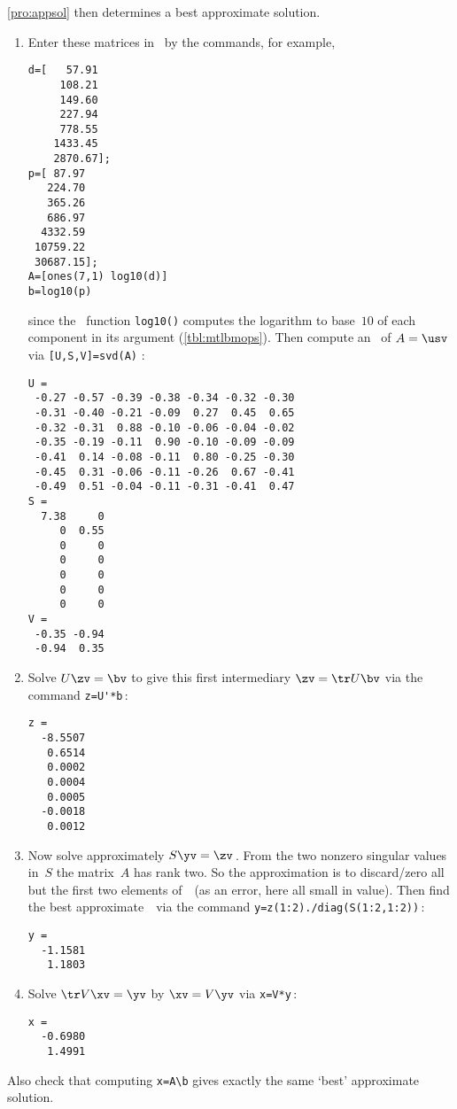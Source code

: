 \begin{example}
\begin{solution}
\cref{pro:appsol} then determines a best approximate solution.
\begin{enumerate}
\item Enter these matrices in \script\ by the commands, for example,
\setbox\ajrqrbox\hbox{}%
\marginajrbox%
\begin{verbatim}
d=[   57.91
     108.21
     149.60
     227.94
     778.55
    1433.45
    2870.67];
p=[ 87.97
   224.70
   365.26
   686.97
  4332.59
 10759.22
 30687.15];
A=[ones(7,1) log10(d)]
b=log10(p)
\end{verbatim}
since the \script\ function \verb|log10()| computes the logarithm to base~\(10\) of each component in its argument (\cref{tbl:mtlbmops}).
Then compute an \svd\ of \(A=\usv\) via \verb|[U,S,V]=svd(A)| \twodp:
\begin{verbatim}
U =
 -0.27 -0.57 -0.39 -0.38 -0.34 -0.32 -0.30
 -0.31 -0.40 -0.21 -0.09  0.27  0.45  0.65
 -0.32 -0.31  0.88 -0.10 -0.06 -0.04 -0.02
 -0.35 -0.19 -0.11  0.90 -0.10 -0.09 -0.09
 -0.41  0.14 -0.08 -0.11  0.80 -0.25 -0.30
 -0.45  0.31 -0.06 -0.11 -0.26  0.67 -0.41
 -0.49  0.51 -0.04 -0.11 -0.31 -0.41  0.47
S =
  7.38     0
     0  0.55
     0     0
     0     0
     0     0
     0     0
     0     0
V =
 -0.35 -0.94
 -0.94  0.35
\end{verbatim}
\item Solve \(U\zv=\bv\) to give this first intermediary \(\zv=\tr U\bv\) via the command \verb|z=U'*b|\,:
\begin{verbatim}
z =
  -8.5507
   0.6514
   0.0002
   0.0004
   0.0005
  -0.0018
   0.0012
\end{verbatim}

\item Now solve approximately \(S\yv=\zv\)\,. 
From the two nonzero singular values in~\(S\) the matrix~\(A\) has rank two.
So the approximation is to discard\slash zero all but the first two elements of~\zv\ (as an error, here all small in value).
Then find the best approximate~\yv\ via the command \verb|y=z(1:2)./diag(S(1:2,1:2))|\,:
\begin{verbatim}
y =
  -1.1581
   1.1803
\end{verbatim}

\item Solve \(\tr V\xv=\yv\) by \(\xv=V\yv\) via \verb|x=V*y|\,:
\begin{verbatim}
x =
  -0.6980
   1.4991
\end{verbatim}
\end{enumerate}
Also check that computing \verb|x=A\b| gives exactly the same `best' approximate solution. 


\end{solution}
\end{example}
